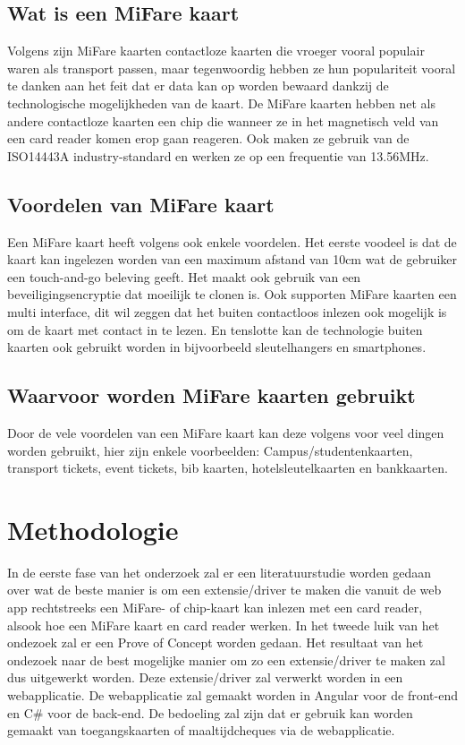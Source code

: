 \documentclass{hogent-article}
\begin{document}
\subsection{Wat is een MiFare kaart}
Volgens \textcite{Digitalid} zijn MiFare kaarten contactloze kaarten die vroeger vooral populair waren als transport passen, maar tegenwoordig hebben ze hun populariteit vooral te danken aan het feit dat er data kan op worden bewaard dankzij de technologische mogelijkheden van de kaart.
De MiFare kaarten hebben net als andere contactloze kaarten een chip die wanneer ze in het magnetisch veld van een card reader komen erop gaan reageren. Ook maken ze gebruik van de ISO14443A industry-standard en werken ze op een frequentie van 13.56MHz.

\subsection{Voordelen van MiFare kaart}
Een MiFare kaart heeft volgens \textcite{Printplast} ook enkele voordelen. Het eerste voodeel is dat de kaart kan ingelezen worden van een maximum afstand van 10cm wat de gebruiker een touch-and-go beleving geeft.
Het maakt ook gebruik van een beveiligingsencryptie dat moeilijk te clonen is. Ook supporten MiFare kaarten een multi interface, dit wil zeggen dat het buiten contactloos inlezen ook mogelijk is om de kaart met contact in te lezen. En tenslotte kan de technologie buiten kaarten ook gebruikt worden in bijvoorbeeld sleutelhangers en smartphones.

\subsection{Waarvoor worden MiFare kaarten gebruikt}
Door de vele voordelen van een MiFare kaart kan deze volgens \textcite{Digitalid} voor veel dingen worden gebruikt, hier zijn enkele voorbeelden: Campus/studentenkaarten, transport tickets, event tickets, bib kaarten, hotelsleutelkaarten en bankkaarten.

\section{Methodologie}
In de eerste fase van het onderzoek zal er een literatuurstudie worden gedaan over wat de beste manier is om een extensie/driver te maken die vanuit de web app rechtstreeks een MiFare- of chip-kaart kan inlezen met een card reader, alsook hoe een MiFare kaart en card reader werken. In het tweede luik van het ondezoek zal er een Prove of Concept worden gedaan. Het resultaat van het ondezoek naar de best mogelijke manier om zo een extensie/driver te maken zal dus uitgewerkt worden. Deze extensie/driver zal verwerkt worden in een webapplicatie. De webapplicatie zal gemaakt worden in Angular voor de front-end en C\# voor de back-end. De bedoeling zal zijn dat er gebruik kan worden gemaakt van toegangskaarten of maaltijdcheques via de webapplicatie.
\end{document}
